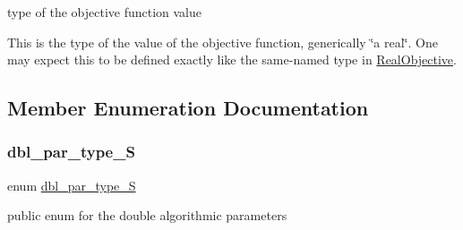 type of the objective function value 

This is the type of the value of the objective function, generically \char`\"{}a real\char`\"{}. One may expect this to be defined exactly like the same-\/named type in \mbox{\hyperlink{class_s_m_spp__di__unipi__it_1_1_real_objective}{Real\+Objective}}. 

\subsection{Member Enumeration Documentation}
\mbox{\label{class_s_m_spp__di__unipi__it_1_1_solver_ace6215148d1e3c41a8844f6d692ee132}} 
\subsubsection{\texorpdfstring{dbl\+\_\+par\+\_\+type\+\_\+S}{dbl\_par\_type\_S}}
{\footnotesize\ttfamily enum \mbox{\hyperlink{class_s_m_spp__di__unipi__it_1_1_solver_ace6215148d1e3c41a8844f6d692ee132}{dbl\+\_\+par\+\_\+type\+\_\+S}}}



public enum for the double algorithmic parameters 

